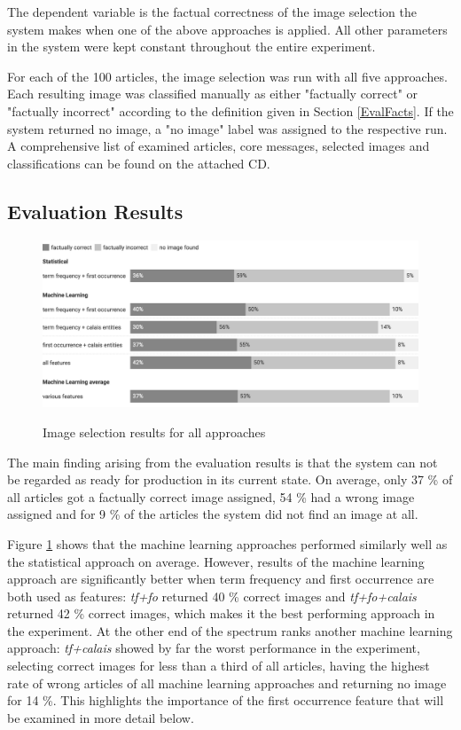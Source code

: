 \documentclass[11pt,a4paper,twoside]{article}
\begin{document}
\noindent The dependent variable is the factual correctness of the image selection the system makes when one of the above approaches is applied. All other parameters in the system were kept constant throughout the entire experiment.

For each of the 100 articles, the image selection was run with all five approaches. Each resulting image was classified manually as either "factually correct" or "factually incorrect" according to the definition given in Section \ref{EvalFacts}. If the system returned no image, a "no image" label was assigned to the respective run. A comprehensive list of examined articles, core messages, selected images and classifications can be found on the attached CD.

\subsection{Evaluation Results} \label{EvalResults}

\begin{figure}[t]
    \caption{Image selection results for all approaches}
    \centering
    \includegraphics[width=\columnwidth]{fig-results-overview.png}
    \label{fig:results-overview}
\end{figure}

The main finding arising from the evaluation results is that the system can not be regarded as ready for production in its current state. On average, only 37 \% of all articles got a factually correct image assigned, 54 \% had a wrong image assigned and for 9 \% of the articles the system did not find an image at all.

Figure \ref{fig:results-overview} shows that the machine learning approaches performed similarly well as the statistical approach on average. However, results of the machine learning approach are significantly better when term frequency and first occurrence are both used as features: \emph{tf+fo} returned 40 \% correct images and \emph{tf+fo+calais} returned 42 \% correct images, which makes it the best performing approach in the experiment. At the other end of the spectrum ranks another machine learning approach: \emph{tf+calais} showed by far the worst performance in the experiment, selecting correct images for less than a third of all articles, having the highest rate of wrong articles of all machine learning approaches and returning no image for 14 \%. This highlights the importance of the first occurrence feature that will be examined in more detail below.
\end{document}
